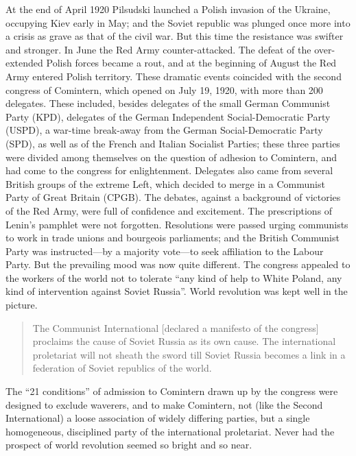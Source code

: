 At the end of April 1920 Pilsudski launched a Polish invasion of the Ukraine, occupying Kiev early in May; and the Soviet republic was plunged once more into a crisis as grave as that of the civil war. But this time the resistance was swifter and stronger. In June the Red Army counter-attacked. The defeat of the over-extended Polish forces became a rout, and at the beginning of August the Red Army entered Polish territory. These dramatic events coincided with the second congress of Comintern, which opened on July 19, 1920, with more than 200 delegates. These included, besides delegates of the small German Communist Party (KPD), delegates of the German Independent Social-Democratic Party (USPD), a war-time break-away from the German Social-Democratic Party (SPD), as well as of the French and Italian Socialist Parties; these three parties were divided among themselves on the question of adhesion to Comintern, and had come to the congress for enlightenment. Delegates also came from several British groups of the extreme Left, which decided to merge in a Communist Party of Great Britain (CPGB). The debates, against a background of victories of the Red Army, were full of confidence and excitement. The prescriptions of Lenin's pamphlet were not forgotten. Resolutions were passed urging communists to work in trade unions and bourgeois parliaments; and the British Communist Party was instructed---by a majority vote---to seek affiliation to the Labour Party. But the prevailing mood was now quite different. The congress appealed to the workers of the world not to tolerate ``any kind of help to White Poland, any kind of intervention against Soviet Russia''. World revolution was kept well in the picture. 

\begin{quote}
The Communist International [declared a manifesto of the congress] proclaims the cause of Soviet Russia as its own cause. The international proletariat will not sheath the sword till Soviet Russia becomes a link in a federation of Soviet republics of the world. 
\end{quote}

The ``21 conditions'' of admission to Comintern drawn up by the congress were designed to exclude waverers, and to make Comintern, not (like the Second International) a loose association of widely differing parties, but a single homogeneous, disciplined party of the international proletariat. Never had the prospect of world revolution seemed so bright and so near. 

